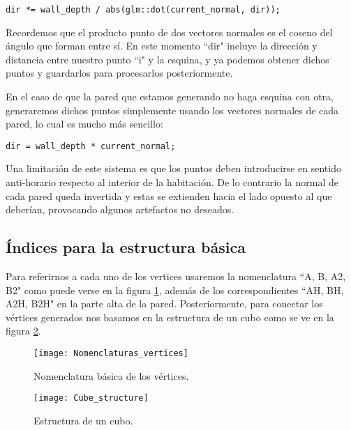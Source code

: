 \begin{lstlisting}
dir *= wall_depth / abs(glm::dot(current_normal, dir));
\end{lstlisting}

Recordemos que el producto punto de dos vectores normales es el coseno del ángulo que forman entre sí. En este momento ``dir" incluye la dirección y distancia entre nuestro punto ``i" y la esquina, y ya podemos obtener dichos puntos y guardarlos para procesarlos posteriormente.

En el caso de que la pared que estamos generando no haga esquina con otra, generaremos dichos puntos simplemente usando los vectores normales de cada pared, lo cual es mucho más sencillo:

\begin{lstlisting}
dir = wall_depth * current_normal;
\end{lstlisting}

Una limitación de este sistema es que los puntos deben introducirse en sentido anti-horario respecto al interior de la habitación. De lo contrario la normal de cada pared queda invertida y estas se extienden hacia el lado opuesto al que deberían, provocando algunos artefactos no deseados.

\clearpage
\subsection{Índices para la estructura básica}
Para referirnos a cada uno de los vertices usaremos la nomenclatura ``A, B, A2, B2" como puede verse en la figura \ref{fig:nomenclatura_vertices}, además de los correspondientes ``AH, BH, A2H, B2H" en la parte alta de la pared. Posteriormente, para conectar los vértices generados nos basamos en la estructura de un cubo como se ve en la figura \ref{fig:estructura_cubo}.

\begin{figure}[H]
    \centering
    \texttt{[image: Nomenclaturas\_vertices]}
    \caption{Nomenclatura básica de los vértices.}
    \label{fig:nomenclatura_vertices}
\end{figure}

\begin{figure}[H]
	\centering
	\texttt{[image: Cube\_structure]}
	\caption{Estructura de un cubo.}
	\label{fig:estructura_cubo}
\end{figure}

